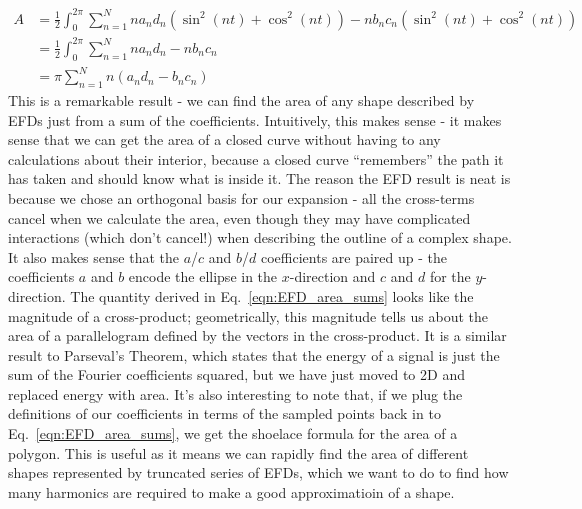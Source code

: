 \documentclass[11pt,a4paper]{article}
\begin{document}
\begin{equation}
	\label{eqn:EFD_area_sums}
	\begin{aligned}
		A & = \frac{1}{2}\int_0^{2\pi}\sum_{n=1}^Nna_nd_n(\sin^2(nt) + \cos^2(nt)) - nb_nc_n(\sin^2(nt) + \cos^2(nt)) \\
		  & = \frac{1}{2}\int_0^{2\pi}\sum_{n=1}^Nna_nd_n - nb_nc_n \\
          & = \pi\sum_{n=1}^Nn(a_nd_n - b_nc_n)
	\end{aligned}
\end{equation}
This is a remarkable result - we can find the area of any shape described by EFDs just from a sum of the coefficients.
\bigbreak
Intuitively, this makes sense - it makes sense that we can get the area of a closed curve without having to any calculations about their interior,
because a closed curve ``remembers'' the path it has taken and should know what is inside it.
The reason the EFD result is neat is because we chose an orthogonal basis for our expansion - all the cross-terms
cancel when we calculate the area, even though they may have complicated interactions (which don't cancel!) when describing the outline of a complex shape.
It also makes sense that the $a$/$c$ and $b$/$d$ coefficients are paired up - the coefficients
$a$ and $b$ encode the ellipse in the $x$-direction and $c$ and $d$ for the $y$-direction. The quantity derived in
Eq.~\ref{eqn:EFD_area_sums} looks like the magnitude of a cross-product; geometrically, this magnitude tells us about
the area of a parallelogram defined by the vectors in the cross-product. It is a similar result to Parseval's Theorem, which
states that the energy of a signal is just the sum of the Fourier coefficients squared, but we have just moved to 2D and replaced
energy with area. It's also interesting to note that, if we plug the definitions of our coefficients in terms of the sampled points back in to Eq.~\ref{eqn:EFD_area_sums},
we get the shoelace formula for the area of a polygon.
\bigbreak
This is useful as it means we can rapidly find the area of different shapes represented by truncated series of EFDs,
which we want to do to find how many harmonics are required to make a good approximatioin of a shape.
\end{document}
